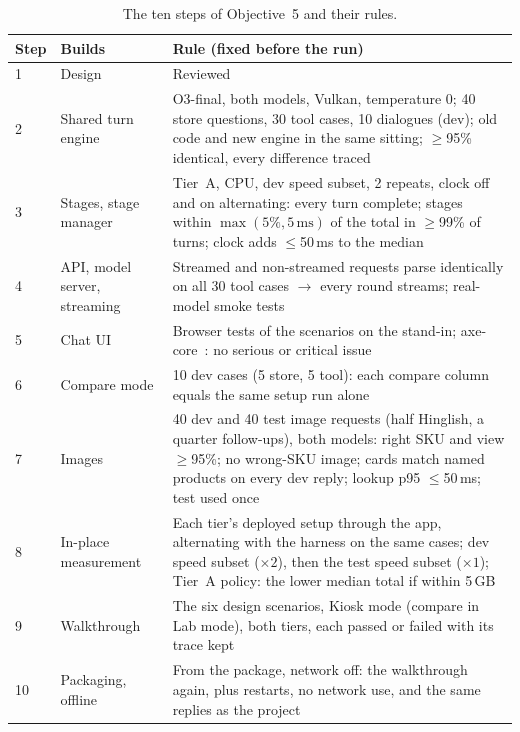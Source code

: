 \documentclass[11pt,a4paper]{article}
\begin{document}
\begin{table}[H]
\centering\small
\caption{The ten steps of Objective~5 and their rules.}\label{tab:steps}
\begin{tabularx}{\textwidth}{p{0.5cm} p{3.4cm} L}
\toprule
Step & Builds & Rule (fixed before the run) \\
 & Design & Reviewed \\
2 & Shared turn engine & O3-final, both models, Vulkan, temperature 0; 40 store questions, 30 tool cases, 10 dialogues
(dev); old code and new engine in the same sitting; $\ge$95\% identical, every difference traced \\
3 & Stages, stage manager & Tier~A, CPU, dev speed subset, 2 repeats, clock off and on alternating: every turn complete;
stages within $\max(5\%, 5\,\text{ms})$ of the total in $\ge$99\% of turns; clock adds $\le$50\,ms to the median \\
4 & API, model server, streaming & Streamed and non-streamed requests parse identically on all 30 tool cases $\to$ every
round streams; real-model smoke tests \\
5 & Chat UI & Browser tests of the scenarios on the stand-in; axe-core~\cite{axe}: no serious or critical issue \\
6 & Compare mode & 10 dev cases (5 store, 5 tool): each compare column equals the same setup run alone \\
7 & Images & 40 dev and 40 test image requests (half Hinglish, a quarter follow-ups), both models: right SKU and view
$\ge$95\%; no wrong-SKU image; cards match named products on every dev reply; lookup p95 $\le$50\,ms; test used once \\
8 & In-place measurement & Each tier's deployed setup through the app, alternating with the harness on the same cases;
dev speed subset ($\times 2$), then the test speed subset ($\times 1$); Tier~A policy: the lower median total if within
5\,GB \\
9 & Walkthrough & The six design scenarios, Kiosk mode (compare in Lab mode), both tiers, each passed or failed with its
trace kept \\
10 & Packaging, offline & From the package, network off: the walkthrough again, plus restarts, no network use, and the
same replies as the project \\
\bottomrule
\end{tabularx}
\end{table}
\end{document}

